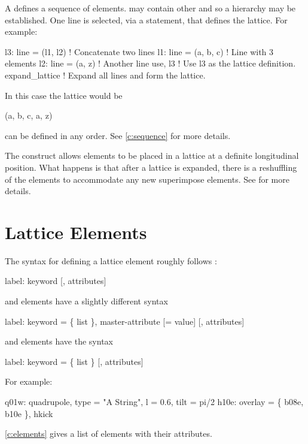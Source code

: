 A  defines a sequence of elements.  may contain
other  and so a hierarchy may be established. One line is
selected, via a  statement, that defines the lattice. For
example:
\begin{example}
  l3: line = (l1, l2)   ! Concatenate two lines
  l1: line = (a, b, c)  ! Line with 3 elements
  l2: line = (a, z)     ! Another line 
  use, l3               ! Use l3 as the lattice definition.
  expand_lattice        ! Expand all lines and form the lattice.
\end{example}
In this case the lattice would be
\begin{example}
  (a, b, c, a, z)
\end{example}
 can be defined in any order. See \cref{c:sequence} for more
details.

The  construct allows elements to be placed in a
lattice at a definite longitudinal position. What happens is that
after a lattice is expanded, there is a reshuffling of the elements to
accommodate any new superimpose elements. See  for more
details.

\section{Lattice Elements}

The syntax for defining a lattice element roughly follows \mad:
\begin{example}
  label: keyword [, attributes]
\end{example}
 and  elements have a slightly different syntax
\begin{example}
  label: keyword = \{ list \}, master-attribute [= value] [, attributes]
\end{example}
and  elements have the syntax
\begin{example}
  label: keyword = \{ list \} [, attributes]
\end{example}  
For example:
\begin{example}
  q01w: quadrupole, type = "A String", l = 0.6, tilt = pi/2
  h10e: overlay = \{ b08e, b10e \}, hkick
\end{example}

\cref{c:elements} gives a list of elements with their attributes.

